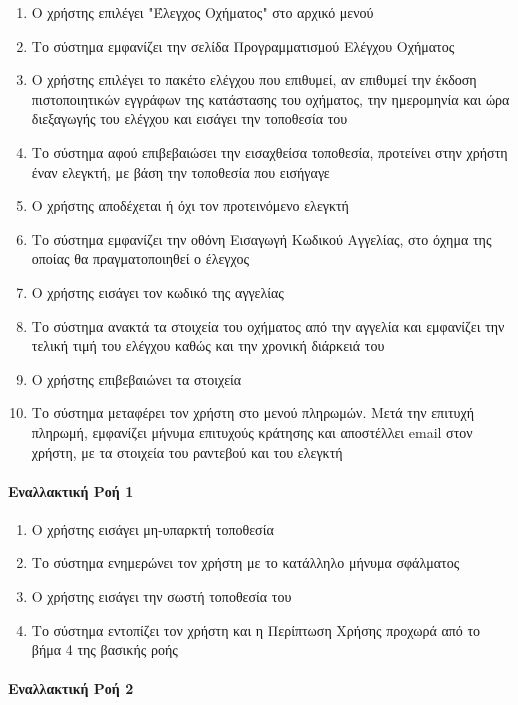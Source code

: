 \documentclass{../ol-softwaremanual}
\begin{document}
	\begin{enumerate}
		\item Ο χρήστης επιλέγει \en"\gr Έλεγχος Οχήματος\en" \gr στο αρχικό μενού
		\item Το σύστημα εμφανίζει την σελίδα Προγραμματισμού Ελέγχου Οχήματος
		\item Ο χρήστης επιλέγει το πακέτο ελέγχου που επιθυμεί, αν επιθυμεί την έκδοση πιστοποιητικών εγγράφων της κατάστασης του οχήματος, την ημερομηνία και ώρα διεξαγωγής του ελέγχου και εισάγει την τοποθεσία του
		\item Το σύστημα αφού επιβεβαιώσει την εισαχθείσα τοποθεσία, προτείνει στην χρήστη έναν ελεγκτή, με βάση την τοποθεσία που εισήγαγε
		\item Ο χρήστης αποδέχεται ή όχι τον προτεινόμενο ελεγκτή
		\item Το σύστημα εμφανίζει την οθόνη Εισαγωγή Κωδικού Αγγελίας, στο όχημα της οποίας θα πραγματοποιηθεί ο έλεγχος		
		\item Ο χρήστης εισάγει τον κωδικό της αγγελίας
		\item Το σύστημα ανακτά τα στοιχεία του οχήματος από την αγγελία και εμφανίζει την τελική τιμή του ελέγχου καθώς και την χρονική διάρκειά του
		\item Ο χρήστης επιβεβαιώνει τα στοιχεία
		\item Το σύστημα μεταφέρει τον χρήστη στο μενού πληρωμών. Μετά την επιτυχή πληρωμή, εμφανίζει μήνυμα επιτυχούς κράτησης και αποστέλλει \en email \gr στον χρήστη, με τα στοιχεία του ραντεβού και του ελεγκτή		
	\end{enumerate}
	
	\paragraph{Εναλλακτική Ροή 1}
	
	\begin{enumerate}
		\item Ο χρήστης εισάγει μη-υπαρκτή τοποθεσία
		\item Το σύστημα ενημερώνει τον χρήστη με το κατάλληλο μήνυμα σφάλματος 
		\item Ο χρήστης εισάγει την σωστή τοποθεσία του
		\item Το σύστημα εντοπίζει τον χρήστη και η Περίπτωση Χρήσης προχωρά από το βήμα 4 της βασικής ροής
	\end{enumerate}

	\paragraph{Εναλλακτική Ροή 2}
	
\end{document}

